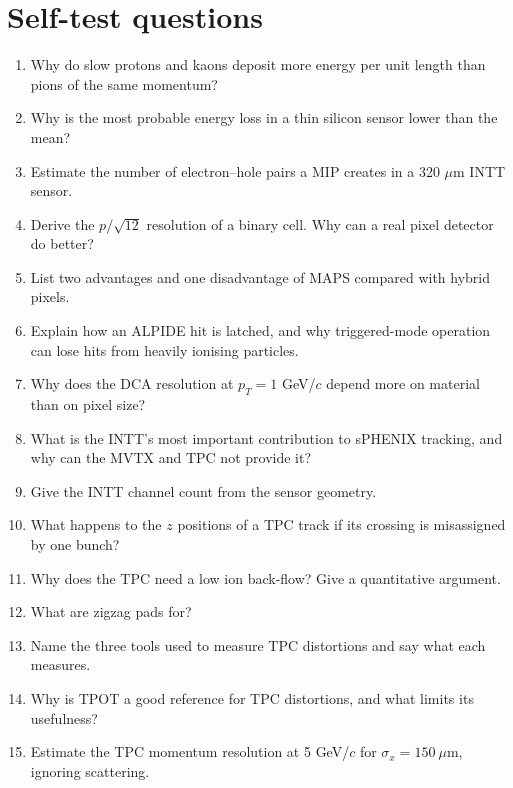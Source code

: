 \documentclass[11pt,letterpaper]{article}
\begin{document}
\section{Self-test questions}
\begin{enumerate}
\item Why do slow protons and kaons deposit more energy per unit length than pions of the same momentum?
\item Why is the most probable energy loss in a thin silicon sensor lower than the mean?
\item Estimate the number of electron--hole pairs a MIP creates in a 320 $\mu$m INTT sensor.
\item Derive the $p/\sqrt{12}$ resolution of a binary cell. Why can a real pixel detector do better?
\item List two advantages and one disadvantage of MAPS compared with hybrid pixels.
\item Explain how an ALPIDE hit is latched, and why triggered-mode operation can lose hits from heavily ionising particles.
\item Why does the DCA resolution at $p_T=1$ GeV/$c$ depend more on material than on pixel size?
\item What is the INTT's most important contribution to sPHENIX tracking, and why can the MVTX and TPC not provide it?
\item Give the INTT channel count from the sensor geometry.
\item What happens to the $z$ positions of a TPC track if its crossing is misassigned by one bunch?
\item Why does the TPC need a low ion back-flow? Give a quantitative argument.
\item What are zigzag pads for?
\item Name the three tools used to measure TPC distortions and say what each measures.
\item Why is TPOT a good reference for TPC distortions, and what limits its usefulness?
\item Estimate the TPC momentum resolution at 5 GeV/$c$ for $\sigma_x=150\ \mu$m, ignoring scattering.
\end{enumerate}

\appendix
\end{document}
